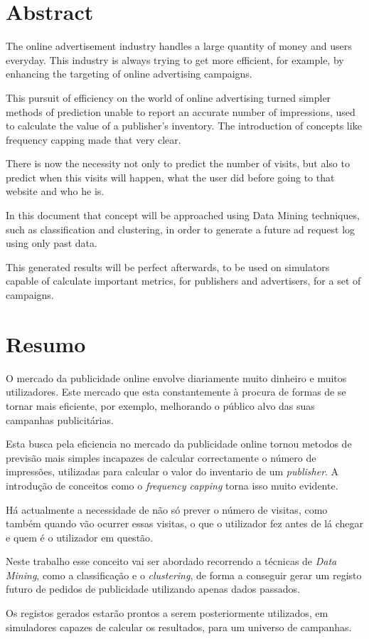 \chapter*{Abstract}

The online advertisement industry handles a large quantity of money and users
everyday.
This industry is always trying to get more efficient, for example, by enhancing
the targeting of online advertising campaigns. 

This pursuit of efficiency on the world of online advertising turned simpler
methods of prediction unable to report an accurate number of
impressions, used to calculate the value
of a publisher's inventory. The introduction of concepts like frequency capping made that very clear.

There is now the necessity not only to predict the number of visits, but also to
predict when this visits will happen, what the user did before going to that
website and who he is.

In this document that concept will be approached using Data Mining techniques, such as classification and clustering, in order to generate a future ad request log
using only past data.

This generated results will be perfect afterwards, to be used on simulators
capable of calculate important metrics, for publishers and advertisers, for a set
of campaigns.

\chapter*{Resumo}

O mercado da publicidade online envolve diariamente muito dinheiro e muitos utilizadores. 
Este mercado que esta constantemente à procura de formas de se tornar
mais eficiente, por exemplo, melhorando o público alvo das suas campanhas
publicitárias. 

Esta busca pela eficiencia no mercado da publicidade online tornou metodos de
previsão mais simples incapazes de calcular correctamente o número de
impressões, utilizadas para calcular o valor do inventario de um
\textit{publisher}.
A introdução de conceitos como o \textit{frequency capping} torna isso muito evidente.

Há actualmente a necessidade de não só prever o número de visitas, como também
quando vão ocurrer essas visitas, o que o utilizador fez antes de lá chegar e
quem é
o utilizador em questão. 

Neste trabalho esse conceito vai ser abordado recorrendo a técnicas de
\textit{Data Mining}, como a classificação e o \textit{clustering}, de forma a conseguir gerar
um registo futuro de pedidos de publicidade utilizando apenas dados passados.

Os registos gerados estarão prontos a serem posteriormente utilizados, em
simuladores capazes de calcular os resultados, para um universo de campanhas.
